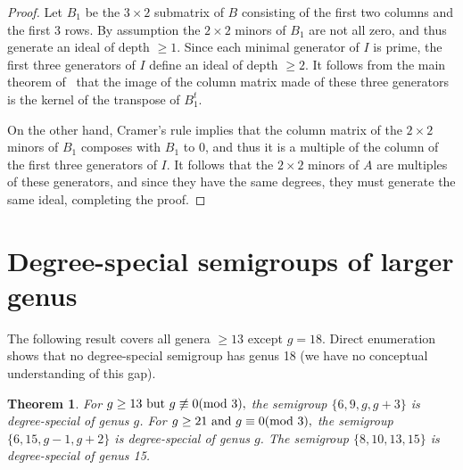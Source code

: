 \documentclass[twoside,12pt, leqno]{amsart}
\newtheorem{theorem}{Theorem}[section]
\theoremstyle{definition}
\begin{document}
\begin{proof}
 Let $B_1$ be the $3\times 2$ submatrix of $B$
 consisting of the first two columns and the first 3 rows. By assumption the $2\times 2$ minors
 of $B_1$ are not all zero, and thus generate an ideal of depth $\geq 1$. Since each minimal generator of $I$ is prime,
the first three generators of $I$ define an ideal of depth $\geq 2$. It follows from the main theorem of~\cite{MR314819} that the
image of the column matrix made of these three generators is the kernel of the transpose of $B_1^t$.

On the other hand, Cramer's rule implies that the column matrix of the $2\times 2$ minors of $B_1$ composes with $B_1$ to 0,
and thus it is a multiple of the column of the first three generators of $I$. It follows that the $2\times 2$ minors of $A$ are
 multiples of these generators, and since they have the same degrees, they
 must generate the same ideal, completing the proof.
 \end{proof}
 



\section{Degree-special semigroups of larger genus}

The following result covers all genera $\geq 13$ except  $g=18$.  Direct enumeration shows that
no degree-special semigroup has genus 18 (we have no conceptual understanding of this gap).

\begin{theorem}\label{all genera}
 For $g\geq 13\hbox{ but } g \not \equiv 0  ({\rm mod}\ 3),$ the semigroup $\{6,9,g,g+3\}$  is degree-special of genus $g$.  For 
$g\geq 21 \hbox{ and } g \equiv 0({\rm mod}\ 3),$ the semigroup $\{6,15,g-1,g+2\}$
is degree-special of genus $g$. The semigroup $\{8,10,13,15\}$ is degree-special of genus 15.
\end{theorem}
\end{document}

